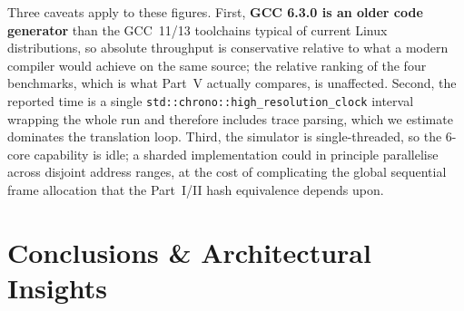 \documentclass[11pt,a4paper]{article}
\begin{document}
\noindent Three caveats apply to these figures. First, \textbf{GCC 6.3.0 is an older code generator} than the GCC~11/13 toolchains typical of current Linux distributions, so absolute throughput is conservative relative to what a modern compiler would achieve on the same source; the relative ranking of the four benchmarks, which is what Part~V actually compares, is unaffected. Second, the reported time is a single \texttt{std::chrono::high\_resolution\_clock} interval wrapping the whole run and therefore includes trace parsing, which we estimate dominates the translation loop. Third, the simulator is single-threaded, so the 6-core capability is idle; a sharded implementation could in principle parallelise across disjoint address ranges, at the cost of complicating the global sequential frame allocation that the Part~I/II hash equivalence depends upon.

\section{Conclusions \& Architectural Insights}
\end{document}
